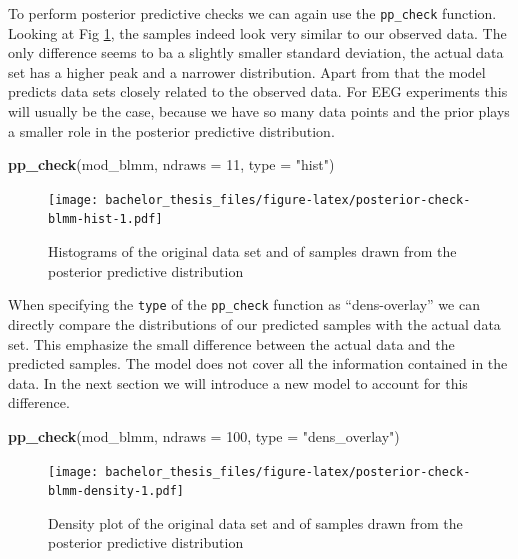 \documentclass[
  doc,12pt,floatsintext]{apa7}
\newenvironment{Shaded}{\begin{snugshade}}{\end{snugshade}}
\newcommand{\AttributeTok}[1]{\textcolor[rgb]{0.13,0.29,0.53}{#1}}
\newcommand{\DecValTok}[1]{\textcolor[rgb]{0.00,0.00,0.81}{#1}}
\newcommand{\FunctionTok}[1]{\textcolor[rgb]{0.13,0.29,0.53}{\textbf{#1}}}
\newcommand{\NormalTok}[1]{#1}
\newcommand{\StringTok}[1]{\textcolor[rgb]{0.31,0.60,0.02}{#1}}
\begin{document}
To perform posterior predictive checks we can again use the \texttt{pp\_check} function. Looking at Fig \ref{fig:posterior-check-blmm-hist}, the samples indeed look very similar to our observed data. The only difference seems to ba a slightly smaller standard deviation, the actual data set has a higher peak and a narrower distribution. Apart from that the model predicts data sets closely related to the observed data. For EEG experiments this will usually be the case, because we have so many data points and the prior plays a smaller role in the posterior predictive distribution.



\begin{Shaded}
\begin{Highlighting}[]
\FunctionTok{pp\_check}\NormalTok{(mod\_blmm, }\AttributeTok{ndraws =} \DecValTok{11}\NormalTok{, }\AttributeTok{type =} \StringTok{"hist"}\NormalTok{)}
\end{Highlighting}
\end{Shaded}

\begin{figure}
\centering
\texttt{[image: bachelor\_thesis\_files/figure-latex/posterior-check-blmm-hist-1.pdf]}
\caption{\label{fig:posterior-check-blmm-hist}Histograms of the original data set and of samples drawn from the posterior predictive distribution}
\end{figure}

When specifying the \texttt{type} of the \texttt{pp\_check} function as ``dens-overlay'' we can directly compare the distributions of our predicted samples with the actual data set. This emphasize the small difference between the actual data and the predicted samples. The model does not cover all the information contained in the data. In the next section we will introduce a new model to account for this difference.



\begin{Shaded}
\begin{Highlighting}[]
\FunctionTok{pp\_check}\NormalTok{(mod\_blmm, }\AttributeTok{ndraws =} \DecValTok{100}\NormalTok{, }\AttributeTok{type =} \StringTok{"dens\_overlay"}\NormalTok{)}
\end{Highlighting}
\end{Shaded}

\begin{figure}
\centering
\texttt{[image: bachelor\_thesis\_files/figure-latex/posterior-check-blmm-density-1.pdf]}
\caption{\label{fig:posterior-check-blmm-density}Density plot of the original data set and of samples drawn from the posterior predictive distribution}
\end{figure}
\end{document}
